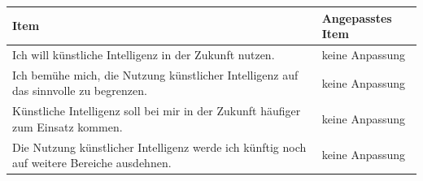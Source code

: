 \begin{center}
\begin{threeparttable}
\caption{Items für Konstrukt: BI}
\label{tab:BI}
\begin{tabularx}{\textwidth}{X X}
\toprule
\textbf{Item} & \textbf{Angepasstes Item} \\
\midrule
Ich will künstliche Intelligenz in der Zukunft nutzen. & keine Anpassung \\
Ich bemühe mich, die Nutzung künstlicher Intelligenz auf das sinnvolle zu begrenzen. & keine Anpassung \\
Künstliche Intelligenz soll bei mir in der Zukunft häufiger zum Einsatz kommen. & keine Anpassung \\
Die Nutzung künstlicher Intelligenz werde ich künftig noch auf weitere Bereiche ausdehnen. & keine Anpassung \\
\bottomrule
\end{tabularx}
\end{threeparttable}
\end{center}
\vspace{1em}
